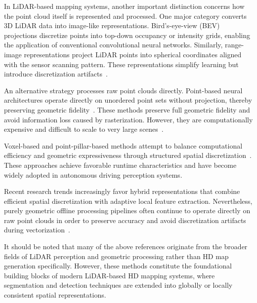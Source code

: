 In LiDAR-based mapping systems, another important distinction concerns how the point cloud itself is represented and processed. One major category converts 3D LiDAR data into image-like representations. Bird’s-eye-view (BEV) projections discretize points into top-down occupancy or intensity grids, enabling the application of conventional convolutional neural networks. Similarly, range-image representations project LiDAR points into spherical coordinates aligned with the sensor scanning pattern. These representations simplify learning but introduce discretization artifacts~\cite{wu2017squeezesegconvolutionalneuralnets}.

An alternative strategy processes raw point clouds directly. Point-based neural architectures operate directly on unordered point sets without projection, thereby preserving geometric fidelity~\cite{qi2017pointnetdeeplearningpoint, thomas2019kpconvflexibledeformableconvolution, hu2020randlanetefficientsemanticsegmentation}. These methods preserve full geometric fidelity and avoid information loss caused by rasterization. However, they are computationally expensive and difficult to scale to very large scenes~\cite{qi2017pointnetdeeplearningpoint, thomas2019kpconvflexibledeformableconvolution, hu2020randlanetefficientsemanticsegmentation}.

Voxel-based and point-pillar-based methods attempt to balance computational efficiency and geometric expressiveness through structured spatial discretization~\cite{graham20173dsemanticsegmentationsubmanifold, lang2019pointpillarsfastencodersobject}. These approaches achieve favorable runtime characteristics and have become widely adopted in autonomous driving perception systems.

Recent research trends increasingly favor hybrid representations that combine efficient spatial discretization with adaptive local feature extraction. Nevertheless, purely geometric offline processing pipelines often continue to operate directly on raw point clouds in order to preserve accuracy and avoid discretization artifacts during vectorization~\cite{liu2019pointvoxelcnnefficient3d}.

It should be noted that many of the above references originate from the broader fields of LiDAR perception and geometric processing rather than HD map generation specifically. However, these methods constitute the foundational building blocks of modern LiDAR-based HD mapping systems, where segmentation and detection techniques are extended into globally or locally consistent spatial representations.

